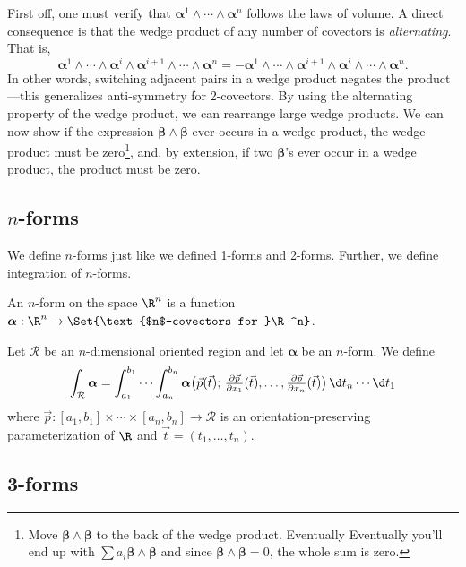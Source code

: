 First off, one must verify that $\bm\alpha^1\wedge\cdots \wedge \bm\alpha^n$
follows the laws of volume.  A direct consequence is that the wedge
product of any number of covectors is \emph{alternating}.
That is,
\[
\bm\alpha^1\wedge \cdots \wedge 
		\bm\alpha^{i}\wedge \bm\alpha^{i+1}\wedge \cdots \wedge \bm\alpha^n
=
-\bm\alpha^1\wedge \cdots \wedge
		\bm\alpha^{i+1}\wedge \bm\alpha^{i}\wedge \cdots \wedge \bm\alpha^n.
\]
In other words, switching adjacent pairs in a wedge product negates the product---this
generalizes anti-symmetry for 2-covectors.  By using the alternating
property of the wedge product, we can rearrange large wedge products.  We
can now show if the expression $\bm\beta\wedge\bm\beta$
ever occurs in a wedge product, the wedge product must be zero\footnote{
Move $\bm\beta\wedge\bm\beta$ to the back of the wedge product.  Eventually
Eventually you'll end up with $\sum a_i\bm\beta\wedge\bm\beta$ and since
$\bm\beta\wedge\bm\beta = 0$, the whole sum is zero.}, and, by extension,
if two $\bm\beta$'s ever occur in a wedge product, the product must be zero.

\subsection{$n$-forms}
We define $n$-forms just like we defined 1-forms and 2-forms.  Further,
we define integration of $n$-forms.

\begin{definition}[$n$-form]
	An $n$-form on the space $\R^n$ is a function $\bm\alpha:\R^n
	\to\Set{\text{$n$-covectors for }\R^n}$.
\end{definition}
\begin{definition}
	Let $\mathcal R$ be an $n$-dimensional oriented region
	and let $\bm\alpha$ be an $n$-form.  We define
	\[
		\int_{\mathcal R} \bm\alpha = \int_{a_1}^{b_1}\cdots
		\int_{a_n}^{b_n} \bm\alpha\formarg{
		\vec p(\vec t)}{
			\tfrac{\partial \vec p}{\partial x_1}(\vec t),
			\ldots,
			\tfrac{\partial \vec p}{\partial x_n}(\vec t)
		} \,\d t_n\cdots \d t_1
	\]
	where $\vec p:[a_1,b_1]\times\cdots\times[a_n,b_n]\to\mathcal R$
	is an orientation-preserving parameterization of $\R$ and
	$\vec t=(t_1,\ldots, t_n)$.
\end{definition}

\subsection{3-forms}

